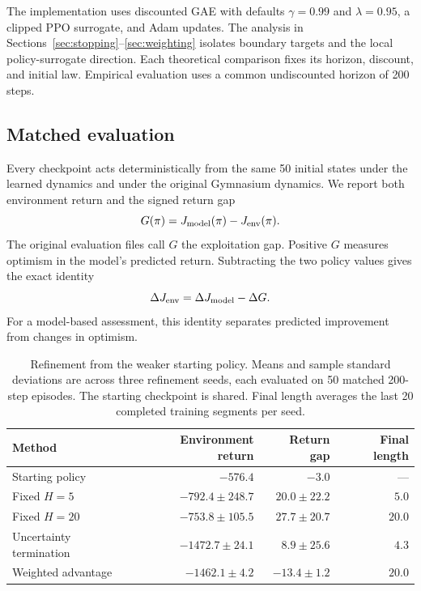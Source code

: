 The implementation uses discounted GAE with defaults $\gamma=0.99$ and $\lambda=0.95$, a clipped PPO surrogate, and Adam updates. The analysis in Sections~\ref{sec:stopping}--\ref{sec:weighting} isolates boundary targets and the local policy-surrogate direction. Each theoretical comparison fixes its horizon, discount, and initial law. Empirical evaluation uses a common undiscounted horizon of 200 steps.

\subsection{Matched evaluation}

Every checkpoint acts deterministically from the same 50 initial states under the learned dynamics and under the original Gymnasium dynamics. We report both environment return and the signed return gap
\begin{equation}
G(\pi)=J_{\mathrm{model}}(\pi)-J_{\mathrm{env}}(\pi).
\end{equation}
The original evaluation files call $G$ the exploitation gap. Positive $G$ measures optimism in the model's predicted return. Subtracting the two policy values gives the exact identity
\begin{equation}
\Delta J_{\mathrm{env}}=\Delta J_{\mathrm{model}}-\Delta G.
\label{eq:return-accounting}
\end{equation}
For a model-based assessment, this identity separates predicted improvement from changes in optimism.

\begin{table}[t]
\centering
\small
\caption{Refinement from the weaker starting policy. Means and sample standard deviations are across three refinement seeds, each evaluated on 50 matched 200-step episodes. The starting checkpoint is shared. Final length averages the last 20 completed training segments per seed.}
\label{tab:refinement}
\begin{tabular}{lrrr}
\toprule
Method & Environment return & Return gap & Final length\\
\midrule
Starting policy & $-576.4$ & $-3.0$ & ---\\
Fixed $H=5$ & $-792.4\pm248.7$ & $20.0\pm22.2$ & $5.0$\\
Fixed $H=20$ & $-753.8\pm105.5$ & $27.7\pm20.7$ & $20.0$\\
Uncertainty termination & $-1472.7\pm24.1$ & $8.9\pm25.6$ & $4.3$\\
Weighted advantage & $-1462.1\pm4.2$ & $-13.4\pm1.2$ & $20.0$\\
\bottomrule
\end{tabular}
\end{table}


